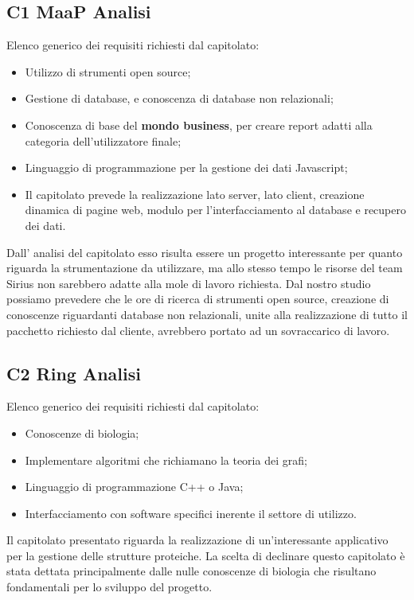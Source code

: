 \subsection{C1 MaaP Analisi}
Elenco generico dei requisiti richiesti dal capitolato:
\begin{itemize} 
\item Utilizzo di strumenti open source;
\item Gestione di database, e conoscenza di database non relazionali;
\item Conoscenza di base del \textbf{mondo business}, per creare report adatti alla categoria dell'utilizzatore finale;
\item Linguaggio di programmazione per la gestione dei dati Javascript;
\item Il capitolato prevede la realizzazione lato server, lato client, creazione dinamica di pagine web, modulo per l'interfacciamento al database e recupero dei dati.
\end{itemize}
Dall' analisi del capitolato esso risulta essere un progetto interessante per quanto riguarda la strumentazione da utilizzare, ma allo stesso tempo le risorse del team Sirius non sarebbero adatte alla mole di lavoro richiesta. Dal nostro studio possiamo prevedere che le ore di ricerca di strumenti open source, creazione di conoscenze riguardanti database non relazionali, unite alla realizzazione di tutto il pacchetto richiesto dal cliente, avrebbero portato ad un sovraccarico di lavoro.
\\
\subsection{C2 Ring Analisi}
Elenco generico dei requisiti richiesti dal capitolato:
\begin{itemize} 
\item Conoscenze di biologia;
\item Implementare algoritmi che richiamano la teoria dei grafi;
\item Linguaggio di programmazione C++ o Java;
\item Interfacciamento con software specifici inerente il settore di utilizzo.
\end{itemize}
Il capitolato presentato riguarda la realizzazione di un'interessante applicativo per la gestione delle strutture proteiche. La scelta di declinare questo capitolato è stata dettata principalmente dalle nulle conoscenze di biologia che risultano fondamentali per lo sviluppo del progetto.\\
